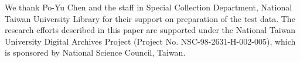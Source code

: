 
We thank Po-Yu Chen and the staff in Special Collection Department, National
Taiwan University Library for their support on preparation of the test data.
The research efforts described in this paper are supported under the National
Taiwan University Digital Archives Project (Project No.
NSC-98-2631-H-002-005), which is sponsored by National Science Council, Taiwan. 
